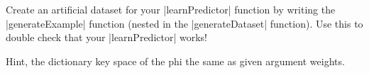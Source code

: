 \item {}

Create an artificial dataset for your |learnPredictor| function by
writing the |generateExample| function (nested in the |generateDataset|
function). Use this to double check that your |learnPredictor| works!

Hint, the dictionary key space of the phi the same as given argument weights.
